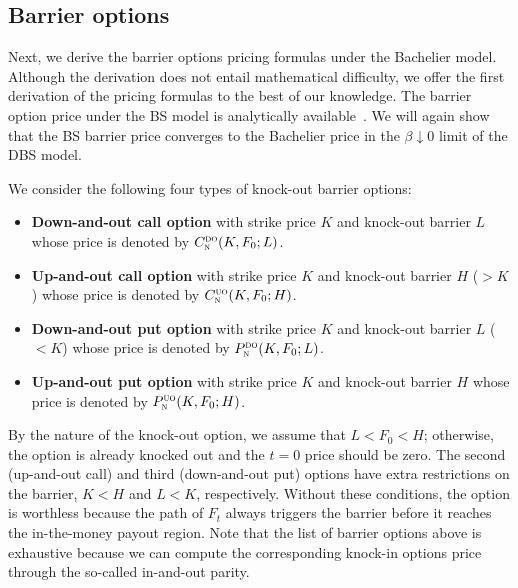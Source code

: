 \documentclass[a4paper,review]{elsarticle}
\newcommand{\Call}[2]{C_\textsc{#1}^\textsc{#2}}
\newcommand{\Put}[2]{P_\textsc{#1}^\textsc{#2}}
\begin{document}
\subsection{Barrier options} \label{ssec:barrier} \noindent
Next, we derive the barrier options pricing formulas under the Bachelier model. Although the derivation does not entail mathematical difficulty, we offer the first derivation of the pricing formulas to the best of our knowledge. The barrier option price under the BS model is analytically available~\citep{haug2007complete}. We will again show that the BS barrier price converges to the Bachelier price in the $\beta\downarrow 0$ limit of the DBS model.

We consider the following four types of knock-out barrier options:
\begin{itemize}
\item \textbf{Down-and-out call option} with strike price $K$ and knock-out barrier $L$ whose price is denoted by $\Call{n}{do}(K, F_0; L)$.
\item \textbf{Up-and-out call option} with strike price $K$ and knock-out barrier $H$ ($> K$) whose price is denoted by $\Call{n}{uo}(K, F_0; H)$.
\item \textbf{Down-and-out put option} with strike price $K$ and knock-out barrier $L$ ($< K$) whose price is denoted by $\Put{n}{do}(K, F_0; L)$.
\item \textbf{Up-and-out put option} with strike price $K$ and knock-out barrier $H$ whose price is denoted by $\Put{n}{uo}(K, F_0; H)$.
\end{itemize}
By the nature of the knock-out option, we assume that $L<F_0<H$; otherwise, the option is already knocked out and the $t=0$ price should be zero. The second (up-and-out call) and third (down-and-out put) options have extra restrictions on the barrier, $K<H$ and $L<K$, respectively.
Without these conditions, the option is worthless because the path of $F_t$ always triggers the barrier before it reaches the in-the-money payout region. Note that the list of barrier options above is exhaustive because we can compute the corresponding knock-in options price through the so-called 
in-and-out parity. 
\end{document}
